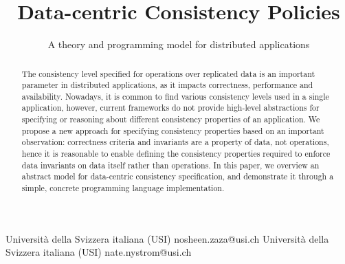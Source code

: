 \documentclass[preprint, numbers]{sigplanconf}
\begin{document}
\setlength{\pdfpageheight}{\paperheight}
\setlength{\pdfpagewidth}{\paperwidth}




\title{Data-centric Consistency Policies}
\subtitle{A theory and programming model for distributed applications}

           {Universit\`a della Svizzera italiana (USI)}
           {nosheen.zaza@usi.ch}
           {Universit\`a della Svizzera italiana (USI)}
           {nate.nystrom@usi.ch}

\maketitle

\begin{abstract}
The consistency level specified for operations over replicated data is 
an important parameter in distributed applications, as it impacts correctness, 
performance and availability. Nowadays, it is common to find various consistency
levels used in a single application, however, current frameworks do not
provide high-level abstractions for specifying or reasoning about different consistency properties of an application. 
We propose a new approach for specifying consistency properties based on an important observation: 
correctness criteria and invariants are a property of data, not operations, hence it is 
reasonable to enable defining the consistency properties required to enforce
data invariants on data itself rather than operations. In this paper, we overview an abstract model
for data-centric consistency specification, and demonstrate it through a simple,
concrete programming language implementation. \end{abstract}


\end{document}
